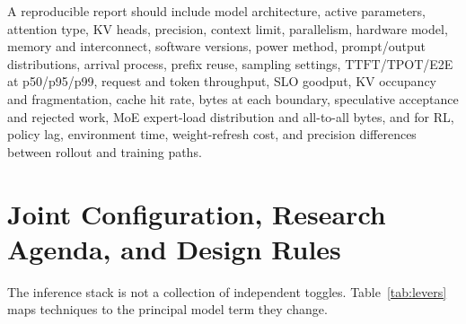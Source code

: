\documentclass[journal]{IEEEtran}
\newcommand{\TTFT}{\ensuremath{\mathrm{TTFT}}}
\newcommand{\TPOT}{\ensuremath{\mathrm{TPOT}}}
\begin{document}
A reproducible report should include model architecture, active parameters, attention type, KV heads, precision, context limit, parallelism, hardware model, memory and interconnect, software versions, power method, prompt/output distributions, arrival process, prefix reuse, sampling settings, \TTFT/\TPOT/E2E at p50/p95/p99, request and token throughput, SLO goodput, KV occupancy and fragmentation, cache hit rate, bytes at each boundary, speculative acceptance and rejected work, MoE expert-load distribution and all-to-all bytes, and for RL, policy lag, environment time, weight-refresh cost, and precision differences between rollout and training paths.

\section{Joint Configuration, Research Agenda, and Design Rules}
The inference stack is not a collection of independent toggles. Table~\ref{tab:levers} maps techniques to the principal model term they change.
\end{document}

